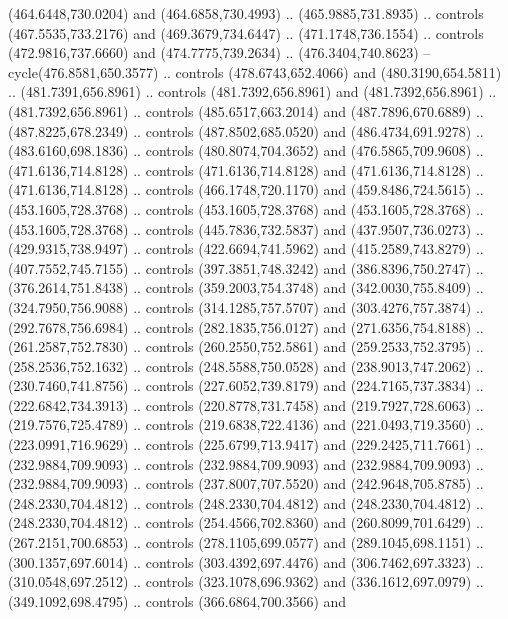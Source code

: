 \begin{scope}[shift={(-162.56685,-567.58888)}]
\begin{scope}
      (464.6448,730.0204) and (464.6858,730.4993) .. (465.9885,731.8935) .. controls
      (467.5535,733.2176) and (469.3679,734.6447) .. (471.1748,736.1554) .. controls
      (472.9816,737.6660) and (474.7775,739.2634) .. (476.3404,740.8623) --
      cycle(476.8581,650.3577) .. controls (478.6743,652.4066) and
      (480.3190,654.5811) .. (481.7391,656.8961) .. controls (481.7392,656.8961) and
      (481.7392,656.8961) .. (481.7392,656.8961) .. controls (485.6517,663.2014) and
      (487.7896,670.6889) .. (487.8225,678.2349) .. controls (487.8502,685.0520) and
      (486.4734,691.9278) .. (483.6160,698.1836) .. controls (480.8074,704.3652) and
      (476.5865,709.9608) .. (471.6136,714.8128) .. controls (471.6136,714.8128) and
      (471.6136,714.8128) .. (471.6136,714.8128) .. controls (466.1748,720.1170) and
      (459.8486,724.5615) .. (453.1605,728.3768) .. controls (453.1605,728.3768) and
      (453.1605,728.3768) .. (453.1605,728.3768) .. controls (445.7836,732.5837) and
      (437.9507,736.0273) .. (429.9315,738.9497) .. controls (422.6694,741.5962) and
      (415.2589,743.8279) .. (407.7552,745.7155) .. controls (397.3851,748.3242) and
      (386.8396,750.2747) .. (376.2614,751.8438) .. controls (359.2003,754.3748) and
      (342.0030,755.8409) .. (324.7950,756.9088) .. controls (314.1285,757.5707) and
      (303.4276,757.3874) .. (292.7678,756.6984) .. controls (282.1835,756.0127) and
      (271.6356,754.8188) .. (261.2587,752.7830) .. controls (260.2550,752.5861) and
      (259.2533,752.3795) .. (258.2536,752.1632) .. controls (248.5588,750.0528) and
      (238.9013,747.2062) .. (230.7460,741.8756) .. controls (227.6052,739.8179) and
      (224.7165,737.3834) .. (222.6842,734.3913) .. controls (220.8778,731.7458) and
      (219.7927,728.6063) .. (219.7576,725.4789) .. controls (219.6838,722.4136) and
      (221.0493,719.3560) .. (223.0991,716.9629) .. controls (225.6799,713.9417) and
      (229.2425,711.7661) .. (232.9884,709.9093) .. controls (232.9884,709.9093) and
      (232.9884,709.9093) .. (232.9884,709.9093) .. controls (237.8007,707.5520) and
      (242.9648,705.8785) .. (248.2330,704.4812) .. controls (248.2330,704.4812) and
      (248.2330,704.4812) .. (248.2330,704.4812) .. controls (254.4566,702.8360) and
      (260.8099,701.6429) .. (267.2151,700.6853) .. controls (278.1105,699.0577) and
      (289.1045,698.1151) .. (300.1357,697.6014) .. controls (303.4392,697.4476) and
      (306.7462,697.3323) .. (310.0548,697.2512) .. controls (323.1078,696.9362) and
      (336.1612,697.0979) .. (349.1092,698.4795) .. controls (366.6864,700.3566) and

\end{scope}
\end{scope}
